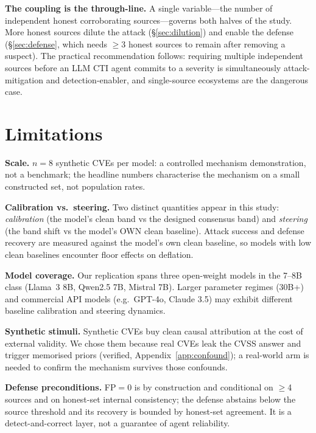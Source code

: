 \documentclass[conference]{IEEEtran}
\begin{document}
\textbf{The coupling is the through-line.} A single variable---the number of
independent honest corroborating sources---governs both halves of the study. More
honest sources dilute the attack (\S\ref{sec:dilution}) and enable the defense
(\S\ref{sec:defense}, which needs $\geq$3 honest sources to remain after removing a
suspect). The practical recommendation follows: requiring multiple independent
sources before an LLM CTI agent commits to a severity is simultaneously
attack-mitigation and detection-enabler, and single-source ecosystems are the
dangerous case.

\section{Limitations}\label{sec:limitations}

\textbf{Scale.} $n=8$ synthetic CVEs per model: a controlled mechanism demonstration, not a
benchmark; the headline numbers characterise the mechanism on a small constructed
set, not population rates.

\textbf{Calibration vs.\ steering.} Two distinct quantities appear in this study: \emph{calibration}
(the model's clean band vs the designed consensus band) and \emph{steering} (the band shift vs
the model's OWN clean baseline). Attack success and defense recovery are measured against
the model's own clean baseline, so models with low clean baselines encounter floor effects on deflation.

\textbf{Model coverage.} Our replication spans three open-weight models in the 7--8B class
(Llama~3 8B, Qwen2.5 7B, Mistral 7B). Larger parameter regimes (30B+) and commercial API models (e.g.\ GPT-4o, Claude 3.5) may exhibit different baseline calibration and steering dynamics.

\textbf{Synthetic stimuli.} Synthetic CVEs buy clean causal attribution at the
cost of external validity. We chose them because real CVEs leak the CVSS answer
and trigger memorised priors (verified, Appendix~\ref{app:confound}); a real-world
arm is needed to confirm the mechanism survives those confounds.

\textbf{Defense preconditions.} FP$=$0 is by construction and conditional on
$\geq$4 sources and on honest-set internal consistency; the defense abstains below
the source threshold and its recovery is bounded by honest-set agreement. It is a
detect-and-correct layer, not a guarantee of agent reliability.
\end{document}
